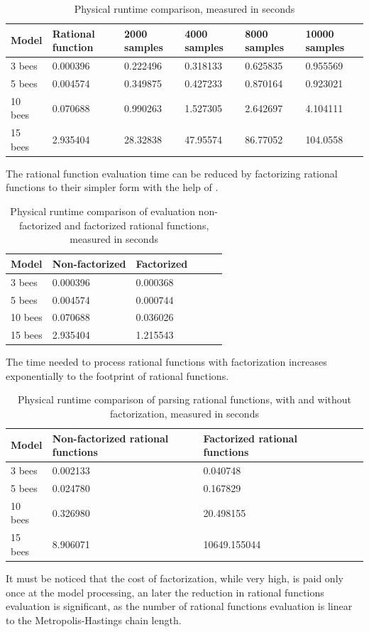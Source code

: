 \documentclass[12pt]{article}
\theoremstyle{definition}
\begin{document}
\begin{table}[H]
  \centering
  \begin{tabular}{|l|l|l|l|l|l|}
    \hline
    Model   & Rational function  & 2000 samples & 4000 samples  & 8000 samples  & 10000 samples  \\ \hline
    3 bees  & 0.000396   & 0.222496  & 0.318133 & 0.625835 & 0.955569 \\ \hline
    5 bees  & 0.004574   & 0.349875  & 0.427233 & 0.870164 & 0.923021 \\ \hline
    10 bees & 0.070688   & 0.990263  & 1.527305 & 2.642697 & 4.104111 \\ \hline
    15 bees & 2.935404   & 28.32838  & 47.95574 & 86.77052 & 104.0558 \\ \hline
  \end{tabular}
  \caption{Physical runtime comparison, measured in seconds}
\end{table}

The rational function evaluation time can be reduced by factorizing rational
functions to their simpler form with the help of \cite{meurer2017sympy}. \\
\begin{table}[H]
  \centering
  \begin{tabular}{|l|l|l|l|l|l|}
    \hline
    Model   & Non-factorized  & Factorized  \\ \hline
    3 bees  & 0.000396   & 0.000368 \\ \hline
    5 bees  & 0.004574   & 0.000744 \\ \hline
    10 bees & 0.070688   & 0.036026 \\ \hline
    15 bees & 2.935404   & 1.215543 \\ \hline
  \end{tabular}
  \caption{Physical runtime comparison of evaluation non-factorized and
    factorized rational functions, measured in seconds}
\end{table}

The time needed to process rational functions with factorization
increases exponentially to the footprint of rational functions. 
\begin{table}[H]
  \centering
  \begin{tabular}{|l|l|l|l|l|l|}
    \hline
    Model   & Non-factorized rational functions & Factorized rational functions \\ \hline
    3 bees  & 0.002133   & 0.040748 \\ \hline
    5 bees  & 0.024780   & 0.167829 \\ \hline
    10 bees & 0.326980   & 20.498155 \\ \hline
    15 bees & 8.906071   & 10649.155044 \\ \hline
  \end{tabular}
  \caption{Physical runtime comparison of parsing rational functions, with and
    without factorization, measured in seconds}
\end{table}
It must be noticed that the cost of factorization, while very high, is paid only
once at the model processing, an later the reduction in rational functions
evaluation is significant, as the number of rational functions evaluation is
linear to the Metropolis-Hastings chain length.
\end{document}
